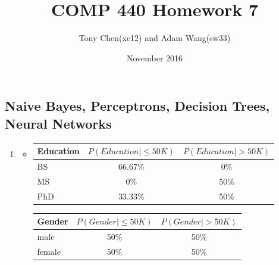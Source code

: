 \documentclass[11pt]{article}
\title{COMP 440 Homework 7}
\author{Tony Chen(xc12) and Adam Wang(sw33)}
\date{November 2016}
\begin{document}
\begin{onehalfspace}
\maketitle{}
\section{Naive Bayes, Perceptrons, Decision Trees, Neural Networks}
\begin{enumerate}[label=\alph*]
	\item
	\begin{itemize}
		\item
			\begin{tabular}{| l || c | c |}
			\hline
			Education & $P(Education|\leq50K)$ & $P(Education|>50K)$ \\ \hline
			BS & 66.67\% & 0\% \\ \hline
			MS & 0\% & 50\% \\ \hline
			PhD & 33.33\% & 50\% \\ \hline
			\end{tabular}
			
			\begin{tabular}{| l || c | c |}
			\hline
			Gender & $P(Gender|\leq50K)$ & $P(Gender|>50K)$ \\ \hline
			male & 50\% & 50\% \\ \hline
			female & 50\% & 50\% \\ \hline
			\end{tabular}
			

\end{itemize}
\end{enumerate}
\end{onehalfspace}
\end{document}
